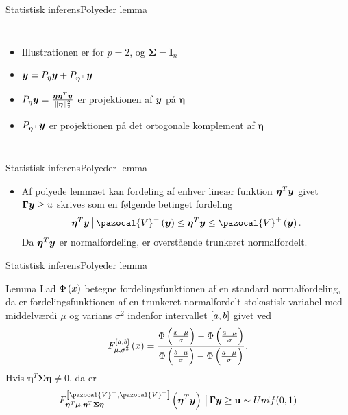 \begin{frame}{Statistisk inferens}{Polyeder lemma}
\begin{columns}[c]
\column{1.5in}
\begin{itemize}
\item Illustrationen er for $p = 2$, og $\boldsymbol \Sigma = \textbf{I}_n$
\item $\bm{y} = P_{\eta} \bm{y} + P_{\boldsymbol{\eta}^\perp} \bm{y}$
\item$ P_{\eta} \bm{y} = \frac{\boldsymbol \eta \boldsymbol \eta^T\bm{y}}{\Vert \boldsymbol \eta \Vert^2_2}  $ er projektionen af $\bm{y}$ på $\boldsymbol \eta$
\item $P_{\boldsymbol{\eta}^\perp} \bm{y}$ er projektionen på det ortogonale komplement af $\boldsymbol \eta$
\end{itemize}

\column{2.2in}

 \end{columns}
% 
%
\end{frame}

\begin{frame}{Statistisk inferens}{Polyeder lemma}
\begin{itemize}
\item Af polyede lemmaet kan fordeling af enhver lineær funktion $\boldsymbol \eta^T \bm{y}$ givet $\boldsymbol \Gamma \bm{y} \geq u$ skrives som en følgende betinget fordeling
\begin{align*}
\boldsymbol \eta^T \vy \given \pazocal{V}^- \del{\vy} \leq \boldsymbol \eta^T \vy \leq \pazocal{V}^+ \del{\vy}.
\end{align*}
Da $\boldsymbol \eta^T \bm{y} $ er normalfordeling, er overstående trunkeret normalfordelt. 
\end{itemize}
\end{frame}

\begin{frame}{Statistisk inferens}{Polyeder lemma}
\begin{block}{Lemma}
Lad \(\Phi \del{x}\) betegne fordelingsfunktionen af en standard normalfordeling, da er fordelingsfunktionen af en trunkeret normalfordelt stokastisk variabel med middelværdi \(\mu\) og varians \(\sigma^2\) indenfor intervallet \(\sbr{a,b}\) givet ved
\begin{align*}
F_{\mu, \sigma^2}^{\sbr{a,b}} \del{x} = \frac{\Phi\del{\frac{x-\mu}{\sigma}} - \Phi\del{\frac{a-\mu}{\sigma}}}{\Phi\del{\frac{b-\mu}{\sigma}} - \Phi\del{\frac{a-\mu}{\sigma}}}.
\end{align*}
Hvis \(\boldsymbol{\eta}^T \boldsymbol{\Sigma} \boldsymbol{\eta} \neq 0\), da er 
\begin{align*}
F_{\boldsymbol{\eta}^T \vmu, \boldsymbol{\eta}^T \boldsymbol{\Sigma} \boldsymbol{\eta}}^{\sbr{\pazocal{V}^-,\pazocal{V}^+}} \del{\boldsymbol{\eta}^T \vy} \given  \boldsymbol{\Gamma} \vy \geq \mathbf{u} \sim Unif(0,1)
\end{align*}
\end{block}
\end{frame}

